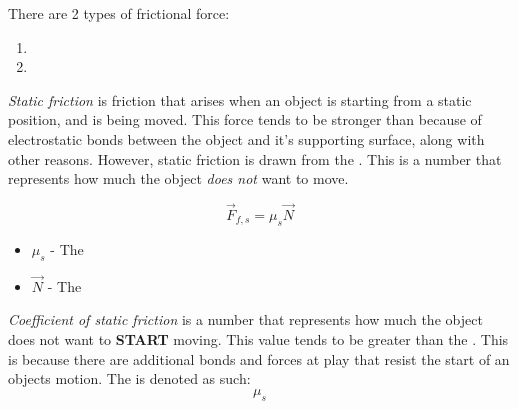 There are 2 types of frictional force:
\begin{enumerate}
  \item {}
  \item {}
\end{enumerate}

\begin{definition} \label{def:Static Friction}
  \emph{Static friction} is friction that arises when an object is starting from a static position, and is being moved.
  This force tends to be stronger than  because of electrostatic bonds between the object and it's supporting surface, along with other reasons.
  However, static friction is drawn from the .
  This is a  number that represents how much the object \emph{does not} want to move.

  \begin{equation} \label{eq:Static Friction}
    \vec{F}_{f,s} = \mu_{s} \vec{N}
  \end{equation}
  \begin{itemize}[noitemsep, nolistsep]
    \item $\mu_{s}$ - The 
    \item $\vec{N}$ - The 
  \end{itemize}
\end{definition}

\begin{definition} \label{def:Coefficient of Static Friction}
  \emph{Coefficient of static friction} is a  number that represents how much the object does not want to \textbf{START} moving.
  This value tends to be greater than the .
  This is because there are additional bonds and forces at play that resist the start of an objects motion.
  The  is denoted as such:
  \begin{equation} \label{eq:Coefficient of Static Friction}
    \mu_{s}
  \end{equation}
\end{definition}

